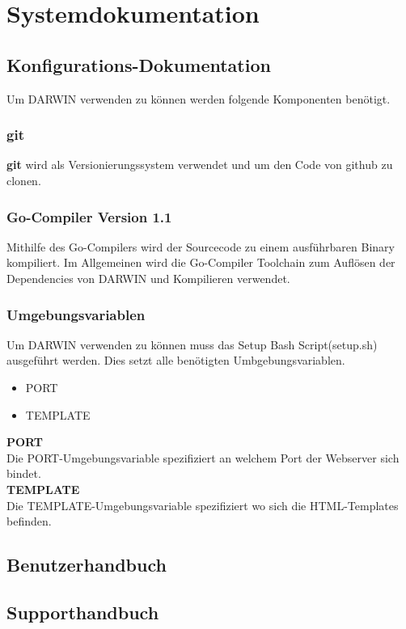 \section{Systemdokumentation}
\subsection{Konfigurations-Dokumentation}
Um DARWIN verwenden zu können werden folgende Komponenten benötigt.
\subsubsection{git}
\textbf{git} wird als Versionierungssystem verwendet und um den 
Code von github zu clonen. 
\subsubsection{Go-Compiler Version 1.1}
Mithilfe des Go-Compilers wird der Sourcecode zu einem ausführbaren Binary
kompiliert. Im Allgemeinen wird die Go-Compiler Toolchain zum Auflösen 
der Dependencies von DARWIN und Kompilieren verwendet.
\subsubsection{Umgebungsvariablen}
Um DARWIN verwenden zu können muss das Setup Bash Script(setup.sh) ausgeführt werden.
Dies setzt alle benötigten Umbgebungsvariablen.
\begin{itemize}
    \item PORT
    \item TEMPLATE
\end{itemize}
\textbf{PORT}
\\
Die PORT-Umgebungsvariable spezifiziert an welchem  Port der Webserver sich
bindet.
\\
\textbf{TEMPLATE}
\\
Die TEMPLATE-Umgebungsvariable spezifiziert wo sich die HTML-Templates befinden. 
\subsection{Benutzerhandbuch}
\subsection{Supporthandbuch}

